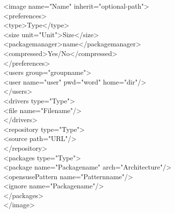 \begin{itemize}
      \begin{Command}{13cm}
      <image name="Name" inherit="optional-path">\\
      \hspace*{1cm}<preferences>\\
      \hspace*{2cm}<type>Type</type>\\
      \hspace*{2cm}<size unit="Unit">Size</size>\\
      \hspace*{2cm}<packagemanager>name</packagemanager>\\
      \hspace*{2cm}<compressed>Yes/No</compressed>\\
      \hspace*{1cm}</preferences>\\
      \hspace*{1cm}<users group="groupname">\\
      \hspace*{2cm}<user name="user" pwd="word" home="dir"/>\\
      \hspace*{1cm}</users>\\
      \hspace*{1cm}<drivers type="Type">\\
      \hspace*{2cm}<file name="Filename"/>\\
      \hspace*{1cm}</drivers>\\
      \hspace*{1cm}<repository type="Type">\\
      \hspace*{2cm}<source path="URL"/>\\
      \hspace*{1cm}</repository>\\
      \hspace*{1cm}<packages type="Type">\\
      \hspace*{2cm}<package name="Packagename" arch="Architecture"/>\\
      \hspace*{2cm}<opensusePattern name="Patternname"/>\\
      \hspace*{2cm}<ignore name="Packagename"/>\\
      \hspace*{1cm}</packages>\\
      </image>
	  \end{Command}


\end{itemize}
